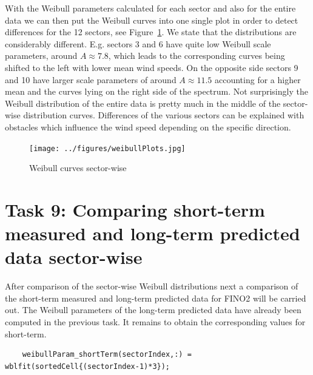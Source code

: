 \documentclass[10pt]{article}
\begin{document}
With the Weibull parameters calculated for each sector and also for the entire data we can then put the Weibull curves into one single plot in order to detect differences for the 12 sectors, see Figure~\ref{fig:weibullPlots}. We state that the distributions are considerably different. E.g. sectors 3 and 6 have quite low Weibull scale parameters, around $A \approx 7.8$, which leads to the corresponding curves being shifted to the left with lower mean wind speeds. On the opposite side sectors 9 and 10 have larger scale parameters of around $A \approx 11.5$ accounting for a higher mean and the curves lying on the right side of the spectrum. Not surprisingly the Weibull distribution of the entire data is pretty much in the middle of the sector-wise distribution curves. Differences of the various sectors can be explained with obstacles which influence the wind speed depending on the specific direction.
\begin{figure}
\centering
  \texttt{[image: ../figures/weibullPlots.jpg]}
  \caption{Weibull curves sector-wise}
  \label{fig:weibullPlots}
\end{figure}


\section{Task 9: Comparing short-term measured and long-term predicted data sector-wise}
After comparison of the sector-wise Weibull distributions next a comparison of the short-term measured and long-term predicted data for FINO2 will be carried out. The Weibull parameters of the long-term predicted data have already been computed in the previous task. It remains to obtain the corresponding values for short-term. 
\begin{lstlisting}
    weibullParam_shortTerm(sectorIndex,:) = wblfit(sortedCell{(sectorIndex-1)*3});
\end{lstlisting} 
\end{document}
